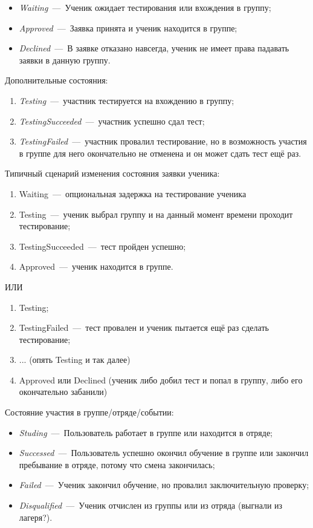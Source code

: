 \documentclass[14pt]{article}
\begin{document}
\begin{itemize}
	\item \emph{Waiting}~---~Ученик ожидает тестирования или вхождения в группу;
	\item \emph{Approved}~---~Заявка принята и ученик находится в группе;
	\item \emph{Declined}~---~В заявке отказано навсегда, ученик не имеет права падавать заявки в данную группу.
\end{itemize}

Дополнительные состояния:
\begin{enumerate}
	\item \emph{Testing}~---~участник тестируется на вхождению в группу;
	\item \emph{TestingSucceeded}~---~участник успешно сдал тест;
	\item \emph{TestingFailed}~---~участник провалил тестирование, но в возможность участия в группе для него окончательно не отменена и он может сдать тест ещё раз.
\end{enumerate}

Типичный сценарий изменения состояния заявки ученика:

\begin{enumerate}
	\item Waiting~---~опциональная задержка на тестирование ученика
	\item Testing~---~ученик выбрал группу и на данный момент времени проходит тестирование;
	\item TestingSucceeded~---~тест пройден успешно;
	\item Approved~---~ученик находится в группе.
\end{enumerate}

ИЛИ

\begin{enumerate}
	\item Testing;
	\item TestingFailed~---~тест провален и ученик пытается ещё раз сделать тестирование;
	\item ... (опять Testing и так далее)
	\item Approved или Declined (ученик либо добил тест и попал в группу, либо его окончательно забанили)
\end{enumerate}

Состояние участия в группе/отряде/событии:
\begin{itemize}
	\item \emph{Studing}~---~Пользователь работает в группе или находится в отряде; 
	\item \emph{Successed}~---~Пользователь успешно окончил обучение в группе или закончил пребывание в отряде, потому что смена закончилась;
	\item \emph{Failed}~---~Ученик закончил обучение, но провалил заключительную проверку;
	\item \emph{Disqualified}~---~Ученик отчислен из группы или из отряда (выгнали из лагеря?).
\end{itemize}
\end{document}
